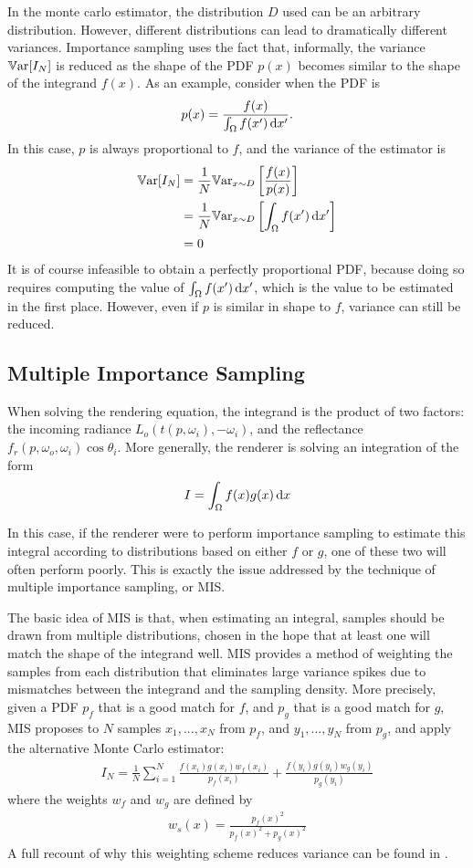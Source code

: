 In the monte carlo estimator, the distribution $D$ used can be an arbitrary distribution. However, different distributions can lead to dramatically different variances. Importance sampling uses the fact that, informally, the variance $\mathbb{V}\text{ar}[I_N]$ is reduced as the shape of the PDF $p(x)$ becomes similar to the shape of the integrand $f(x)$. As an example, consider when the PDF is 
$$ 
p(x)=\frac{f(x)}{\int_\Omega f(x') \,\mathrm{d} x'}.
$$ 
In this case, $p$ is always proportional to $f$, and the variance of the estimator is
\begin{align*}
\mathbb{V}\text{ar}[I_N]
&= \frac{1}{N}\mathbb{V}\text{ar}_{x\sim D}\left[\frac{f(x)}{p(x)}\right]\\
&= \frac{1}{N}\mathbb{V}\text{ar}_{x\sim D}\left[\int_\Omega f(x') \,\mathrm{d} x'\right]\\
&=0
\end{align*}
It is of course infeasible to obtain a perfectly proportional PDF, because doing so requires computing the value of $\int_\Omega f(x') \,\mathrm{d} x'$, which is the value to be estimated in the first place. However, even if $p$ is similar in shape to $f$, variance can still be reduced.

\subsection{Multiple Importance Sampling}
\label{subsection MIS}
When solving the rendering equation, the integrand is the product of two factors: the incoming radiance $L_o(t(p,\omega_i),-\omega_i)$, and the reflectance $f_r(p,\omega_o,\omega_i)\cos\theta_i$. More generally, the renderer is solving an integration of the form
$$
I = \int_\Omega f(x)g(x)\,\mathrm{d} x
$$

In this case, if the renderer were to perform importance sampling to estimate this integral according to distributions based on either $f$ or $g$, one of these two will often perform poorly\cite{pharr2016physically}. This is exactly the issue addressed by the technique of multiple importance sampling, or MIS.

The basic idea of MIS is that, when estimating an integral, samples should be drawn from multiple distributions, chosen in the hope that at least one will match the shape of the integrand well. MIS provides a method of weighting the samples from each distribution that eliminates large variance spikes due to mismatches between the integrand and the sampling density. More precisely, given a PDF $p_f$ that is a good match for $f$, and $p_g$ that is a good match for $g$, MIS proposes to $N$ samples $x_1,...,x_N$ from $p_f$, and $y_1,...,y_N$ from $p_g$, and apply the alternative Monte Carlo estimator:
\begin{align}
    I_N = \frac{1}{N} \sum_{i=1}^{N} \frac{f(x_i)g(x_i)w_f(x_i)}{p_f(x_i)} + \frac{f(y_i)g(y_i)w_g(y_i)}{p_g(y_i)}
    \label{MIS}
\end{align}
where the weights $w_f$ and $w_g$ are defined by
\begin{align*}
    w_s(x) = \frac{p_f(x)^2}{p_f(x)^2+p_g(x)^2}
\end{align*}
A full recount of why this weighting scheme reduces variance can be found in \cite{pharr2016physically}. 

